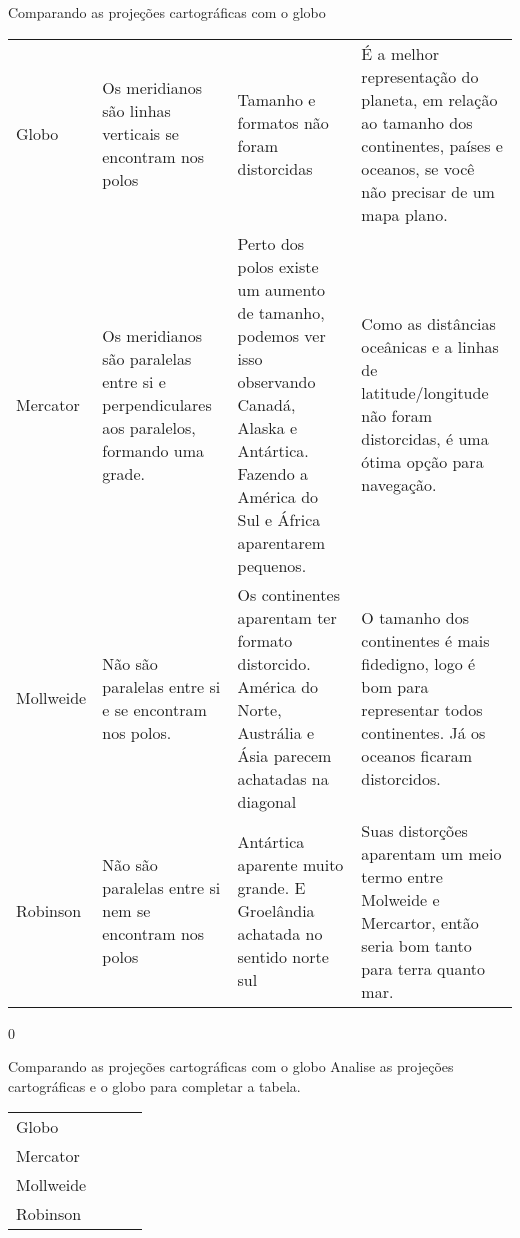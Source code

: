 {\begin{answer}{Comparando as projeções cartográficas com o globo}
{\begin{table}[H]
\begin{tabular}{|l|d{.2\linewidth}|d{.25\linewidth}|d{.3\linewidth}|}
\tcolor{} &  &  &  \\
\hline
Globo & Os meridianos são linhas verticais se encontram nos polos & Tamanho e formatos não foram distorcidas
& É a melhor representação do planeta, em relação ao tamanho dos continentes, países e oceanos, se você não precisar de um mapa plano. \\
\hline
Mercator & Os meridianos são paralelas entre si e perpendiculares aos paralelos,  formando uma grade. & Perto dos polos existe um aumento de tamanho, podemos ver isso observando Canadá, Alaska e Antártica. Fazendo a América do Sul e África aparentarem pequenos. & Como as distâncias oceânicas e a linhas de latitude/longitude não foram distorcidas, é uma ótima opção para navegação. \\
\hline
Mollweide & Não são paralelas entre si e se encontram nos polos. & Os continentes aparentam ter formato distorcido. América do Norte, Austrália e Ásia parecem achatadas na diagonal 
& O tamanho dos continentes é mais fidedigno, logo é bom para representar todos continentes. Já os oceanos ficaram distorcidos. \\
\hline
Robinson & Não são paralelas entre si nem se encontram nos polos & Antártica aparente muito grande. E Groelândia achatada no sentido norte sul & Suas distorções aparentam um meio termo entre Molweide e Mercartor, então seria bom tanto para terra quanto mar. \\
\hline
\end{tabular}
\end{table}
}
{0}
\end{answer}

\begin{task}{Comparando as projeções cartográficas com o globo}
Analise as projeções cartográficas e o globo para completar a tabela. 

\begin{table}[H]
\centering
\begin{tabular}{|l|e{.2\textwidth}|e{.25\textwidth}|l|}
\hline
\tcolor{} &  &  &  \tabularnewline
\hline
Globo & & & \\[5.15em]
\hline
Mercator & & & \\[5.15em]
\hline
Mollweide & & & \\[5.15em]
\hline
Robinson & & & \\[5.15em]
\hline
\end{tabular}
\end{table}
\end{task}

}
